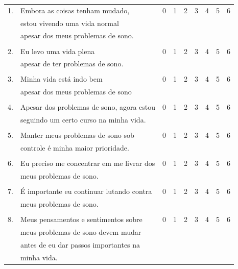 \documentclass[
  ,doc,11pt, twoside,floatsintext]{apa6}
\begin{document}
\begin{appendix}
\begin{table}[h]
\centering
\begin{tabular}{lllllllll}
1. & Embora as coisas tenham mudado,           & 0 & 1 & 2 & 3 & 4 & 5 & 6 \\
   & estou vivendo uma vida normal             &   &   &   &   &   &   &   \\
   & apesar dos meus problemas de sono.        &   &   &   &   &   &   &   \\
   &                                           &   &   &   &   &   &   &   \\
2. & Eu levo uma vida plena                    & 0 & 1 & 2 & 3 & 4 & 5 & 6 \\
   & apesar de ter problemas de sono.          &   &   &   &   &   &   &   \\
   &                                           &   &   &   &   &   &   &   \\
3. & Minha vida está indo bem                  & 0 & 1 & 2 & 3 & 4 & 5 & 6 \\
   & apesar dos meus problemas de sono         &   &   &   &   &   &   &   \\
   &                                           &   &   &   &   &   &   &   \\
4. & Apesar dos problemas de sono, agora estou & 0 & 1 & 2 & 3 & 4 & 5 & 6 \\
   & seguindo um certo curso na minha vida.    &   &   &   &   &   &   &   \\
   &                                           &   &   &   &   &   &   &   \\
5. & Manter meus problemas de sono sob         & 0 & 1 & 2 & 3 & 4 & 5 & 6 \\
   & controle é minha maior prioridade.        &   &   &   &   &   &   &   \\
   &                                           &   &   &   &   &   &   &   \\
6. & Eu preciso me concentrar em me livrar dos & 0 & 1 & 2 & 3 & 4 & 5 & 6 \\
   & meus problemas de sono.                   &   &   &   &   &   &   &   \\
   &                                           &   &   &   &   &   &   &   \\
7. & É importante eu continuar lutando contra  & 0 & 1 & 2 & 3 & 4 & 5 & 6 \\
   & meus problemas de sono.                   &   &   &   &   &   &   &   \\
   &                                           &   &   &   &   &   &   &   \\
8. & Meus pensamentos e sentimentos sobre      & 0 & 1 & 2 & 3 & 4 & 5 & 6 \\
   & meus problemas de sono devem mudar        &   &   &   &   &   &   &   \\
   & antes de eu dar passos importantes na     &   &   &   &   &   &   &   \\
   & minha vida.                               &   &   &   &   &   &   &  
\end{tabular}
\end{table}

\end{appendix}
\end{document}
